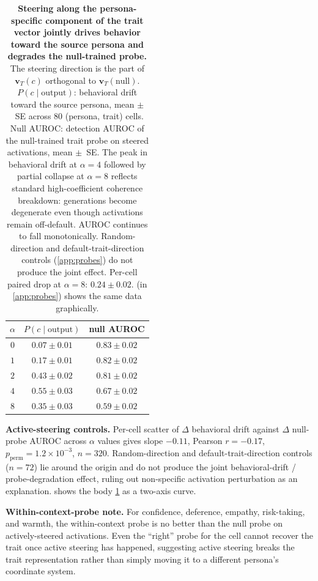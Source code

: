 \documentclass{article}
\theoremstyle{plain}
\theoremstyle{definition}
\theoremstyle{remark}
\begin{document}
\begin{table}[h!]
     \centering
     \small
     \setlength{\tabcolsep}{6pt}
     \caption{\textbf{Steering along the persona-specific component of the trait vector jointly drives behavior toward the source persona and degrades the null-trained probe.} The steering direction is the part of $\mathbf{v}_T(c)$ orthogonal to $\mathbf{v}_T(\text{null})$. $P(c \mid \text{output})$: behavioral drift toward the source persona, mean $\pm$~SE across $80$ (persona, trait) cells. Null AUROC: detection AUROC of the null-trained trait probe on steered activations, mean $\pm$~SE. The peak in behavioral drift at $\alpha = 4$ followed by partial collapse at $\alpha = 8$ reflects standard high-coefficient coherence breakdown: generations become degenerate even though activations remain off-default. AUROC continues to fall monotonically. Random-direction and default-trait-direction controls (\cref{app:probes}) do not produce the joint effect. Per-cell paired drop at $\alpha = 8$: $0.24 \pm 0.02$.  (in \cref{app:probes}) shows the same data graphically.}
     \label{tab:causal-alpha-sweep}
     \begin{tabular}{ccc}
         \toprule
        $\alpha$ & $P(c \mid \text{output})$ & null AUROC \\
         \midrule
         $0$ & $0.07 \pm 0.01$ & $0.83 \pm 0.02$ \\
         $1$ & $0.17 \pm 0.01$ & $0.82 \pm 0.02$ \\
         $2$ & $0.43 \pm 0.02$ & $0.81 \pm 0.02$ \\
         $4$ & $0.55 \pm 0.03$ & $0.67 \pm 0.02$ \\
         $8$ & $0.35 \pm 0.03$ & $0.59 \pm 0.02$ \\
         \bottomrule
     \end{tabular}
 \end{table}

\textbf{Active-steering controls.} Per-cell scatter of $\Delta$ behavioral drift against $\Delta$ null-probe AUROC across $\alpha$ values gives slope $-0.11$, Pearson $r = -0.17$, $p_\mathrm{perm} = 1.2 \times 10^{-3}$, $n = 320$. Random-direction and default-trait-direction controls ($n = 72$) lie around the origin and do not produce the joint behavioral-drift / probe-degradation effect, ruling out non-specific activation perturbation as an explanation.  shows the body \cref{tab:causal-alpha-sweep} as a two-axis curve.


\textbf{Within-context-probe note.} For confidence, deference, empathy, risk-taking, and warmth, the within-context probe is no better than the null probe on actively-steered activations. Even the ``right'' probe for the cell cannot recover the trait once active steering has happened, suggesting active steering breaks the trait representation rather than simply moving it to a different persona's coordinate system.
\end{document}
